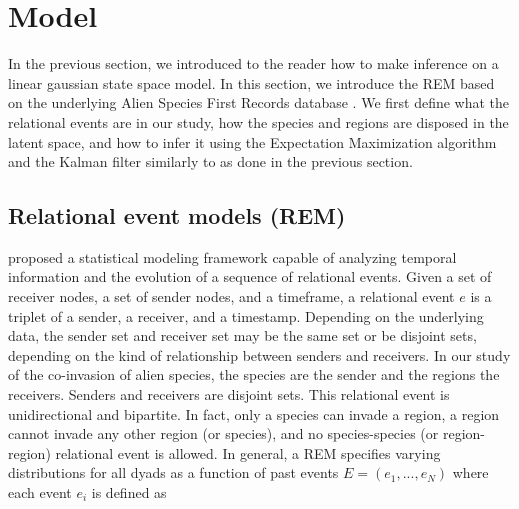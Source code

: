 \documentclass[mscthesis]{usiinfthesis}
\begin{document}



\chapter{Model}
In the previous section, we introduced to the reader how to make inference on a linear gaussian state space model. In this section, we introduce the REM based on the underlying Alien Species First Records database \cite{intro:dataset}. We first define what the relational events are in our study, how the species and regions are disposed in the latent space, and how to infer it using the Expectation Maximization algorithm and the Kalman filter similarly to as done in the previous section.

\section{Relational event models (REM)}
\label{model:rem}

\citet{rem:butts} proposed a statistical modeling framework capable of analyzing temporal information and the evolution of a sequence of relational events. Given a set of receiver nodes, a set of sender nodes, and a timeframe, a relational event $e$ is a triplet of a sender, a receiver, and a timestamp. Depending on the underlying data, the sender set and receiver set may be the same set or be disjoint sets, depending on the kind of relationship between senders and receivers. In our study of the co-invasion of alien species, the species are the sender and the regions the receivers. Senders and receivers are disjoint sets. This relational event is unidirectional and bipartite. In fact, only a species can invade a region, a region cannot invade any other region (or species), and no species-species (or region-region) relational event is allowed. In general, a REM specifies varying distributions for all dyads as a function of past events $E=(e_1, ..., e_N)$ where each event $e_i$ is defined as
\end{document}
